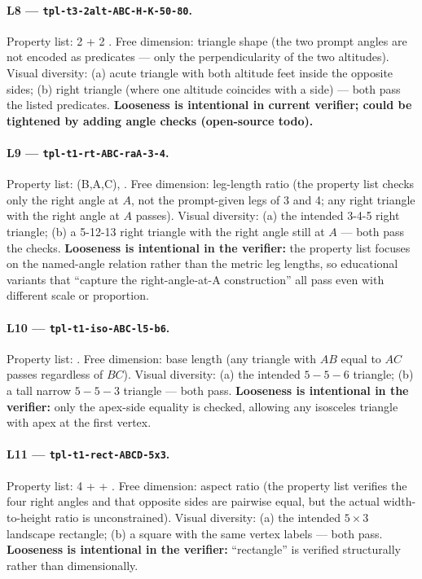 \paragraph{L8 --- \texttt{tpl-t3-2alt-ABC-H-K-50-80}.}
Property list: 2  + 2 .
Free dimension: triangle shape (the two prompt angles are not encoded as predicates --- only the perpendicularity of the two altitudes).
Visual diversity: (a) acute triangle with both altitude feet inside the opposite sides; (b) right triangle (where one altitude coincides with a side) --- both pass the listed predicates.
\textbf{Looseness is intentional in current verifier; could be tightened by adding angle checks (open-source todo).}

\paragraph{L9 --- \texttt{tpl-t1-rt-ABC-raA-3-4}.}
Property list: (B,A,C), .
Free dimension: leg-length ratio (the property list checks only the right angle at $A$, not the prompt-given legs of 3 and 4; any right triangle with the right angle at $A$ passes).
Visual diversity: (a) the intended 3-4-5 right triangle; (b) a 5-12-13 right triangle with the right angle still at $A$ --- both pass the checks.
\textbf{Looseness is intentional in the verifier:} the property list focuses on the named-angle relation rather than the metric leg lengths, so educational variants that ``capture the right-angle-at-A construction'' all pass even with different scale or proportion.

\paragraph{L10 --- \texttt{tpl-t1-iso-ABC-l5-b6}.}
Property list: .
Free dimension: base length (any triangle with $AB$ equal to $AC$ passes regardless of $BC$).
Visual diversity: (a) the intended $5{-}5{-}6$ triangle; (b) a tall narrow $5{-}5{-}3$ triangle --- both pass.
\textbf{Looseness is intentional in the verifier:} only the apex-side equality is checked, allowing any isosceles triangle with apex at the first vertex.

\paragraph{L11 --- \texttt{tpl-t1-rect-ABCD-5x3}.}
Property list: 4  +  + .
Free dimension: aspect ratio (the property list verifies the four right angles and that opposite sides are pairwise equal, but the actual width-to-height ratio is unconstrained).
Visual diversity: (a) the intended $5\times 3$ landscape rectangle; (b) a square with the same vertex labels --- both pass.
\textbf{Looseness is intentional in the verifier:} ``rectangle'' is verified structurally rather than dimensionally.

